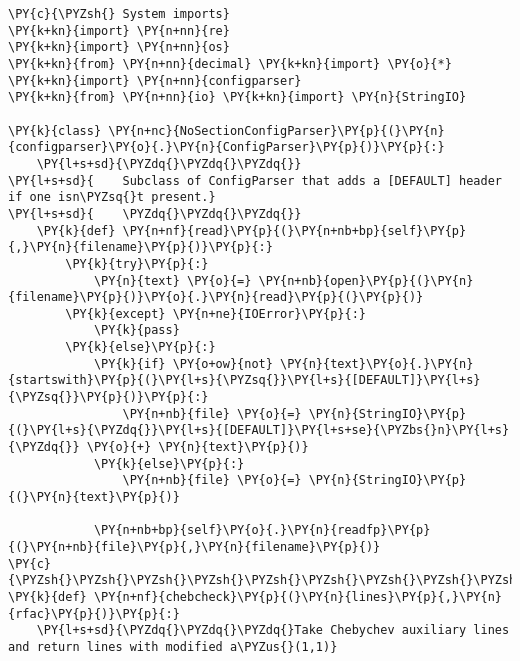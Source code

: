 \begin{Verbatim}[commandchars=\\\{\}]
\PY{c}{\PYZsh{} System imports}
\PY{k+kn}{import} \PY{n+nn}{re}
\PY{k+kn}{import} \PY{n+nn}{os}
\PY{k+kn}{from} \PY{n+nn}{decimal} \PY{k+kn}{import} \PY{o}{*}
\PY{k+kn}{import} \PY{n+nn}{configparser}
\PY{k+kn}{from} \PY{n+nn}{io} \PY{k+kn}{import} \PY{n}{StringIO}

\PY{k}{class} \PY{n+nc}{NoSectionConfigParser}\PY{p}{(}\PY{n}{configparser}\PY{o}{.}\PY{n}{ConfigParser}\PY{p}{)}\PY{p}{:}
    \PY{l+s+sd}{\PYZdq{}\PYZdq{}\PYZdq{}}
\PY{l+s+sd}{    Subclass of ConfigParser that adds a [DEFAULT] header if one isn\PYZsq{}t present.}
\PY{l+s+sd}{    \PYZdq{}\PYZdq{}\PYZdq{}}
    \PY{k}{def} \PY{n+nf}{read}\PY{p}{(}\PY{n+nb+bp}{self}\PY{p}{,}\PY{n}{filename}\PY{p}{)}\PY{p}{:}
        \PY{k}{try}\PY{p}{:}
            \PY{n}{text} \PY{o}{=} \PY{n+nb}{open}\PY{p}{(}\PY{n}{filename}\PY{p}{)}\PY{o}{.}\PY{n}{read}\PY{p}{(}\PY{p}{)}
        \PY{k}{except} \PY{n+ne}{IOError}\PY{p}{:}
            \PY{k}{pass}
        \PY{k}{else}\PY{p}{:}
            \PY{k}{if} \PY{o+ow}{not} \PY{n}{text}\PY{o}{.}\PY{n}{startswith}\PY{p}{(}\PY{l+s}{\PYZsq{}}\PY{l+s}{[DEFAULT]}\PY{l+s}{\PYZsq{}}\PY{p}{)}\PY{p}{:}
                \PY{n+nb}{file} \PY{o}{=} \PY{n}{StringIO}\PY{p}{(}\PY{l+s}{\PYZdq{}}\PY{l+s}{[DEFAULT]}\PY{l+s+se}{\PYZbs{}n}\PY{l+s}{\PYZdq{}} \PY{o}{+} \PY{n}{text}\PY{p}{)}
            \PY{k}{else}\PY{p}{:}
                \PY{n+nb}{file} \PY{o}{=} \PY{n}{StringIO}\PY{p}{(}\PY{n}{text}\PY{p}{)}

            \PY{n+nb+bp}{self}\PY{o}{.}\PY{n}{readfp}\PY{p}{(}\PY{n+nb}{file}\PY{p}{,}\PY{n}{filename}\PY{p}{)}
\PY{c}{\PYZsh{}\PYZsh{}\PYZsh{}\PYZsh{}\PYZsh{}\PYZsh{}\PYZsh{}\PYZsh{}\PYZsh{}\PYZsh{}\PYZsh{}\PYZsh{}\PYZsh{}\PYZsh{}\PYZsh{}\PYZsh{}\PYZsh{}\PYZsh{}\PYZsh{}\PYZsh{}\PYZsh{}\PYZsh{}\PYZsh{}\PYZsh{}\PYZsh{}\PYZsh{}\PYZsh{}\PYZsh{}\PYZsh{}\PYZsh{}\PYZsh{}\PYZsh{}\PYZsh{}\PYZsh{}\PYZsh{}\PYZsh{}\PYZsh{}\PYZsh{}\PYZsh{}\PYZsh{}\PYZsh{}\PYZsh{}\PYZsh{}\PYZsh{}\PYZsh{}\PYZsh{}\PYZsh{}\PYZsh{}\PYZsh{}\PYZsh{}\PYZsh{}\PYZsh{}\PYZsh{}\PYZsh{}\PYZsh{}\PYZsh{}\PYZsh{}\PYZsh{}\PYZsh{}\PYZsh{}\PYZsh{}\PYZsh{}\PYZsh{}\PYZsh{}\PYZsh{}\PYZsh{}\PYZsh{}\PYZsh{}\PYZsh{}\PYZsh{}\PYZsh{}\PYZsh{}\PYZsh{}\PYZsh{}\PYZsh{}\PYZsh{}\PYZsh{}\PYZsh{}\PYZsh{}}
\PY{k}{def} \PY{n+nf}{chebcheck}\PY{p}{(}\PY{n}{lines}\PY{p}{,}\PY{n}{rfac}\PY{p}{)}\PY{p}{:}
    \PY{l+s+sd}{\PYZdq{}\PYZdq{}\PYZdq{}Take Chebychev auxiliary lines and return lines with modified a\PYZus{}(1,1)}


\end{Verbatim}
